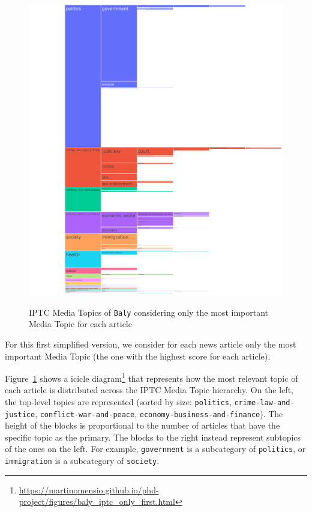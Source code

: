 \begin{figure}[!htbp]
    \centering
    \href{https://martinomensio.github.io/phd-project/figures/baly_iptc_only_first.html}{\includegraphics[trim={2.65cm 0cm 0cm 0cm},clip,width=\linewidth]{figures/baly_iptc_only_first.pdf}}
    \caption{IPTC Media Topics of \texttt{Baly} considering only the most important Media Topic for each article}
    \label{fig:baly_iptc_only_first}
\end{figure}

For this first simplified version, we consider for each news article only the most important Media Topic (the one with the highest score for each article).

Figure~\ref{fig:baly_iptc_only_first}
shows a icicle diagram\footnote{\url{https://martinomensio.github.io/phd-project/figures/baly_iptc_only_first.html}} that represents how the most relevant topic of each article is distributed across the IPTC Media Topic hierarchy.
On the left, the top-level topics are represented (sorted by size: \texttt{politics}, \texttt{crime-law-and-justice}, \texttt{conflict-war-and-peace}, \texttt{economy-business-and-finance}).
The height of the blocks is proportional to the number of articles that have the specific topic as the primary.
The blocks to the right instead represent subtopics of the ones on the left. For example, \texttt{government} is a subcategory of \texttt{politics}, or \texttt{immigration} is a subcategory of \texttt{society}.

